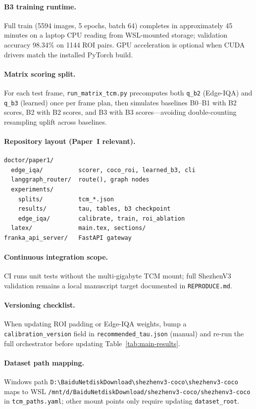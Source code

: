 \paragraph{B3 training runtime.}
Full train (5594 images, 5 epochs, batch 64) completes in approximately 45 minutes on a laptop CPU reading from WSL-mounted storage; validation accuracy 98.34\% on 1144 ROI pairs.
GPU acceleration is optional when CUDA drivers match the installed PyTorch build.

\paragraph{Matrix scoring split.}
For each test frame, \texttt{run\_matrix\_tcm.py} precomputes both \texttt{q\_b2} (Edge-IQA) and \texttt{q\_b3} (learned) once per frame plan, then simulates baselines B0--B1 with B2 scores, B2 with B2 scores, and B3 with B3 scores---avoiding double-counting resampling uplift across baselines.

\paragraph{Repository layout (Paper~I relevant).}
\begin{verbatim}
doctor/paper1/
  edge_iqa/          scorer, coco_roi, learned_b3, cli
  langgraph_router/  route(), graph nodes
  experiments/
    splits/          tcm_*.json
    results/         tau, tables, b3 checkpoint
    edge_iqa/        calibrate, train, roi_ablation
  latex/             main.tex, sections/
franka_api_server/   FastAPI gateway
\end{verbatim}

\paragraph{Continuous integration scope.}
CI runs unit tests without the multi-gigabyte TCM mount; full ShezhenV3 validation remains a local manuscript target documented in \texttt{REPRODUCE.md}.

\paragraph{Versioning checklist.}
When updating ROI padding or Edge-IQA weights, bump a \texttt{calibration\_version} field in \texttt{recommended\_tau.json} (manual) and re-run the full orchestrator before updating Table~\ref{tab:main-results}.

\paragraph{Dataset path mapping.}
Windows path \texttt{D:\textbackslash BaiduNetdiskDownload\textbackslash shezhenv3-coco\textbackslash shezhenv3-coco} maps to WSL \texttt{/mnt/d/BaiduNetdiskDownload/shezhenv3-coco/shezhenv3-coco} in \texttt{tcm\_paths.yaml}; other mount points only require updating \texttt{dataset\_root}.

